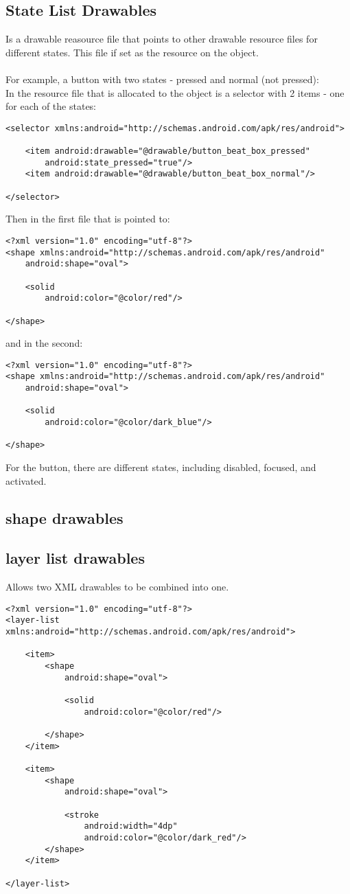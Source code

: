 \documentclass[]{article}
\begin{document}
\subsection{State List Drawables}
Is a drawable reasource file that points to other drawable resource files for different states.  This file if set as the resource on the object.
\\\\
For example, a button with two states - pressed and normal (not pressed):
\\
In the resource file that is allocated to the object is a selector with 2 items - one for each of the states:
\begin{lstlisting}
<selector xmlns:android="http://schemas.android.com/apk/res/android">

	<item android:drawable="@drawable/button_beat_box_pressed"
		android:state_pressed="true"/>
	<item android:drawable="@drawable/button_beat_box_normal"/>

</selector>
\end{lstlisting}
Then in the first file that is pointed to:
\begin{lstlisting}
<?xml version="1.0" encoding="utf-8"?>
<shape xmlns:android="http://schemas.android.com/apk/res/android"
	android:shape="oval">

	<solid
		android:color="@color/red"/>

</shape>
\end{lstlisting}
and in the second:
\begin{lstlisting}
<?xml version="1.0" encoding="utf-8"?>
<shape xmlns:android="http://schemas.android.com/apk/res/android"
	android:shape="oval">

	<solid
		android:color="@color/dark_blue"/>

</shape>
\end{lstlisting}
For the button, there are different states, including disabled, focused, and activated.

\subsection{shape drawables}

\subsection{layer list drawables}
Allows two XML drawables to be combined into one.
\begin{lstlisting}
<?xml version="1.0" encoding="utf-8"?>
<layer-list xmlns:android="http://schemas.android.com/apk/res/android">

	<item>
		<shape
			android:shape="oval">

			<solid
				android:color="@color/red"/>

		</shape>
	</item>

	<item>
		<shape
			android:shape="oval">

			<stroke
				android:width="4dp"
				android:color="@color/dark_red"/>
		</shape>
	</item>

</layer-list>


\end{lstlisting}
\end{document}
